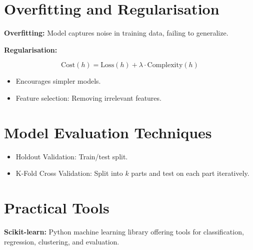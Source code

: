 \section{Overfitting and Regularisation}

\textbf{Overfitting:} Model captures noise in training data, failing to generalize.

\textbf{Regularisation:}

\[
\text{Cost}(h) = \text{Loss}(h) + \lambda \cdot \text{Complexity}(h)
\]

\begin{itemize}
    \item Encourages simpler models.
    \item Feature selection: Removing irrelevant features.
\end{itemize}

\section{Model Evaluation Techniques}

\begin{itemize}
    \item Holdout Validation: Train/test split.
    \item K-Fold Cross Validation: Split into $k$ parts and test on each part iteratively.
\end{itemize}

\section{Practical Tools}

\textbf{Scikit-learn:} Python machine learning library offering tools for classification, regression, clustering, and evaluation.
